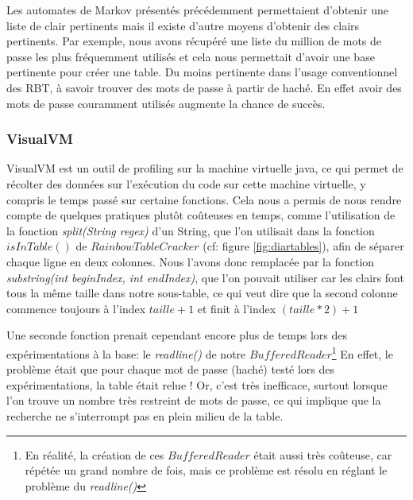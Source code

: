 \documentclass[french,12pt]{article}
\begin{document}
        
        \indent Les automates de Markov présentés précédemment permettaient d'obtenir une liste de clair pertinents mais il existe d'autre moyens d'obtenir des clairs pertinents. Par exemple, nous avons récupéré une liste du million de mots de passe\cite{CommonPassword} les plus fréquemment utilisés et cela nous permettait d'avoir une base pertinente pour créer une table. Du moins pertinente dans l'usage conventionnel des RBT, à savoir trouver des mots de passe à partir de haché. En effet avoir des mots de passe couramment utilisés augmente la chance de succès. 

        \subsubsection{VisualVM\cite{VisualVM}}\label{section:VisualVM}
        VisualVM est un outil de profiling sur la machine virtuelle java\cite{VMJava}, ce qui permet de récolter des données sur l'exécution du code sur cette machine virtuelle, y compris le temps passé sur certaine fonctions. Cela nous a permis de nous rendre compte de quelques pratiques plutôt coûteuses en temps, comme l'utilisation de la fonction \textit{split(String regex)} d'un String, que l'on utilisait dans la fonction $isInTable()$ de $RainbowTableCracker$ (cf: figure \ref{fig:diartables}), afin de séparer chaque ligne en deux colonnes.
        Nous l'avons donc remplacée par la fonction \textit{substring(int beginIndex, int endIndex)}, que l'on pouvait utiliser car les clairs font tous la même taille dans notre sous-table, ce qui veut dire que la second colonne commence toujours à l'index $taille+1$ et finit à l'index $(taille*2)+1$
         
         
         Une seconde fonction prenait cependant encore plus de temps lors des expérimentations à la base: le \textit{readline()} de notre $BufferedReader$\cite{BuffReader}\footnote{En réalité, la création de ces $BufferedReader$ était aussi très coûteuse, car répétée un grand nombre de fois, mais ce problème est résolu en réglant le problème du \textit{readline()}}
        En effet, le problème était que pour chaque mot de passe (haché) testé lors des expérimentations, la table était relue ! Or, c'est très inefficace, surtout lorsque l'on trouve un nombre très restreint de mots de passe, ce qui implique que la recherche ne s'interrompt pas en plein milieu de la table.
\end{document}
